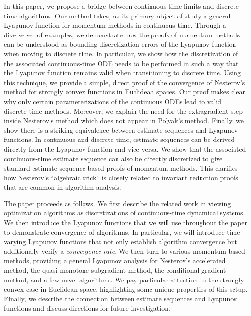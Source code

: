 \documentclass[11pt]{article}
\theoremstyle{plain}
\begin{document}
In this paper, we propose a bridge between continuous-time limits and discrete-time algorithms.  Our method takes, as its primary object of study a general Lyapunov function for momentum methods in continuous time.  Through a diverse set of examples, we demonstrate how the proofs of momentum methods can be understood as bounding discretization errors of the Lyapunov function when moving to discrete time.  In particular, we show how the discretization of the associated continuous-time ODE needs to be performed in such a way that the Lyapunov function remains valid when transitioning to discrete time.
Using this technique, we provide a simple, direct proof of the convergence of Nesterov's method for strongly convex functions in Euclidean spaces.  Our proof makes clear why only certain parameterizations of the continuous ODEs lead to valid discrete-time methods.  Moreover, we explain the need for the extragradient step inside Nesterov's method which does not appear in Polyak's method.  
Finally, we show there is a striking equivalence between estimate sequences and Lyapunov functions.  In continuous and discrete time, estimate sequences can be derived directly from the Lyapunov function and vice versa.  We show that the associated continuous-time estimate sequence can also be directly discretized to give standard estimate-sequence based proofs of momentum methods.  This clarifies how Nesterov's ``algebraic trick'' is closely related to invariant reduction proofs that are common in algorithm analysis.

The paper proceeds as follows.  We first describe the related work in viewing optimization algorithms as discretizations of continuous-time dynamical systems.  We then introduce the Lyapunov functions that we will use throughout the paper to demonstrate convergence of algorithms.  In particular, we will introduce time-varying Lyapunov functions that not only establish algorithm convergence but additionally verify a \emph{convergence rate}.  
 We then turn to various momentum-based methods, providing a general Lyapunov analysis for Nesterov's accelerated method, the quasi-monotone subgradient method, the conditional gradient method, and a few novel algorithms.  We pay particular attention to the strongly convex case in Euclidean space, highlighting some unique properties of this setup.  Finally, we describe the connection between estimate sequences and Lyapunov functions and discuss directions for future investigation.
 
\end{document}
